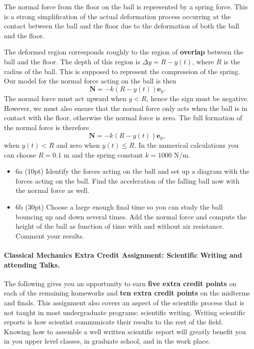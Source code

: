 \documentclass[%
oneside,                 %
final,                   %
10pt]{article}
\begin{document}
The normal force from the floor on the ball is represented by a spring force. This
is a strong simplification of the actual deformation process occurring at the contact
between the ball and the floor due to the deformation of both the ball and the floor.

The deformed region corresponds roughly to the region of \textbf{overlap} between the
ball and the floor. The depth of this region is $\Delta y = R − y(t)$, where $R$
is the radius of the ball. This is supposed to represent the compression of the spring.
Our model for the normal force acting on the ball is then
\[
\bm{N} = −k (R − y(t)) \bm{e}_y. 
\]
The normal force must act upward when $y < R$,
hence the sign must be negative.
However, we must also ensure that the normal force only acts when the ball is in
contact with the floor, otherwise the normal force is zero. The full formation of the
normal force is therefore
\[
\bm{N} = −k (R − y(t)) \bm{e}_y, 
\]
when $y(t) < R$ and zero when $y(t) \le R$.
In the numerical calculations you can choose $R=0.1$ m and the spring constant $k=1000$ N/m.

\begin{itemize}
\item 6a (10pt) Identify the forces acting on the ball and set up a diagram with the forces acting on the ball. Find the acceleration of the falling ball now with the normal force as well.

\item 6b (30pt) Choose a large enough final time so you can study the ball bouncing up and down several times. Add the normal force and compute the height of the ball as function of time with and without air resistance. Comment your results.
\end{itemize}

\noindent
\paragraph{Classical Mechanics Extra Credit Assignment: Scientific Writing and attending Talks.}
The following gives you an opportunity to earn \textbf{five extra credit
points} on each of the remaining homeworks and \textbf{ten extra credit points}
on the midterms and finals.  This assignment also covers an aspect of
the scientific process that is not taught in most undergraduate
programs: scientific writing.  Writing scientific reports is how
scientist communicate their results to the rest of the field.  Knowing
how to assemble a well written scientific report will greatly benefit
you in you upper level classes, in graduate school, and in the work
place.
\end{document}
